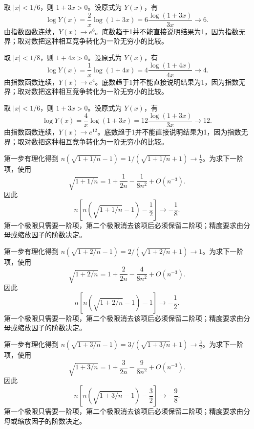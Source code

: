 \documentclass[UTF8,12pt,a4paper,fontset=fandol]{ctexart}
\begin{document}
\begin{solve}\label{ans:c5q4}
取 $|x|<1/6$，则 $1+3x>0$。设原式为 $Y(x)$，有
\[
\log Y(x)=\frac{2}x\log(1+3x)=6\frac{\log(1+3x)}{3x}\longrightarrow 6.
\]
由指数函数连续，$Y(x)\to e^{6}$。底数趋于1并不能直接说明结果为1，因为指数无界；取对数把这种相互竞争转化为一阶无穷小的比较。
\end{solve}

\begin{solve}\label{ans:c5q5}
取 $|x|<1/8$，则 $1+4x>0$。设原式为 $Y(x)$，有
\[
\log Y(x)=\frac{1}x\log(1+4x)=4\frac{\log(1+4x)}{4x}\longrightarrow 4.
\]
由指数函数连续，$Y(x)\to e^{4}$。底数趋于1并不能直接说明结果为1，因为指数无界；取对数把这种相互竞争转化为一阶无穷小的比较。
\end{solve}

\begin{solve}\label{ans:c5q6}
取 $|x|<1/6$，则 $1+3x>0$。设原式为 $Y(x)$，有
\[
\log Y(x)=\frac{4}x\log(1+3x)=12\frac{\log(1+3x)}{3x}\longrightarrow 12.
\]
由指数函数连续，$Y(x)\to e^{12}$。底数趋于1并不能直接说明结果为1，因为指数无界；取对数把这种相互竞争转化为一阶无穷小的比较。
\end{solve}

\begin{solve}\label{ans:c5q7}
第一步有理化得到 $n(\sqrt{1+1/n}-1)=1/(\sqrt{1+1/n}+1)\to \frac{1}{2}$。为求下一阶项，使用
\[
\sqrt{1+1/n}=1+\frac{1}{2n}-\frac{1}{8n^2}+O(n^{-3}).
\]
因此
\[
n\left[n\left(\sqrt{1+1/n}-1\right)-\frac{1}{2}\right]\longrightarrow-\frac{1}{8}.
\]
第一个极限只需要一阶项，第二个极限消去该项后必须保留二阶项；精度要求由分母或缩放因子的阶数决定。
\end{solve}

\begin{solve}\label{ans:c5q8}
第一步有理化得到 $n(\sqrt{1+2/n}-1)=2/(\sqrt{1+2/n}+1)\to 1$。为求下一阶项，使用
\[
\sqrt{1+2/n}=1+\frac{2}{2n}-\frac{4}{8n^2}+O(n^{-3}).
\]
因此
\[
n\left[n\left(\sqrt{1+2/n}-1\right)-1\right]\longrightarrow-\frac{1}{2}.
\]
第一个极限只需要一阶项，第二个极限消去该项后必须保留二阶项；精度要求由分母或缩放因子的阶数决定。
\end{solve}

\begin{solve}\label{ans:c5q9}
第一步有理化得到 $n(\sqrt{1+3/n}-1)=3/(\sqrt{1+3/n}+1)\to \frac{3}{2}$。为求下一阶项，使用
\[
\sqrt{1+3/n}=1+\frac{3}{2n}-\frac{9}{8n^2}+O(n^{-3}).
\]
因此
\[
n\left[n\left(\sqrt{1+3/n}-1\right)-\frac{3}{2}\right]\longrightarrow-\frac{9}{8}.
\]
第一个极限只需要一阶项，第二个极限消去该项后必须保留二阶项；精度要求由分母或缩放因子的阶数决定。
\end{solve}
\end{document}
